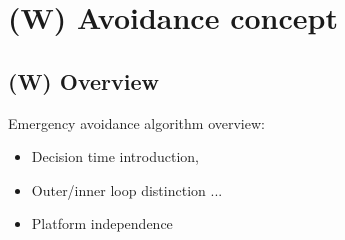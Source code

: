 \section{(W) Avoidance concept}\label{s:avoidanceConcept}
    
\subsection{(W) Overview}\label{s:avoidanceAlgorithmOverView}
    \noindent Emergency avoidance algorithm overview:
    \begin{itemize}
        \item Decision time introduction, 
        \item Outer/inner loop distinction ...
        \item Platform independence
    \end{itemize}

